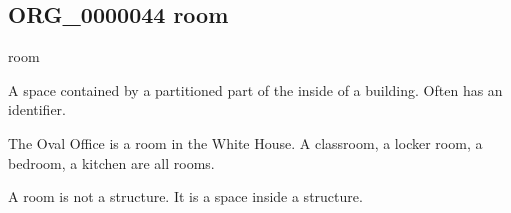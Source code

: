 \documentclass[letterpaper,10pt,english]{sphinxmanual}
\begin{document}
\begin{sphinxShadowBox}

\sphinxAtStartPar
{}
\end{sphinxShadowBox}
\begin{quote}

\ignorespaces \end{quote}


\subsection{ORG\_0000044 \sphinxhyphen{} room}
\label{\detokenize{doc-ORG_0000044:org-0000044-room}}\label{\detokenize{doc-ORG_0000044:index-0}}\label{\detokenize{doc-ORG_0000044::doc}}
\begin{sphinxShadowBox}

\sphinxAtStartPar
room
\end{sphinxShadowBox}

\begin{sphinxShadowBox}

\sphinxAtStartPar
A space contained by a partitioned part of the inside of a building.  Often has an identifier.
\end{sphinxShadowBox}

\begin{sphinxShadowBox}

\sphinxAtStartPar
{}
\end{sphinxShadowBox}

\begin{sphinxShadowBox}

\sphinxAtStartPar
The Oval Office is a room in the White House.  A classroom, a locker room, a bedroom, a kitchen are all rooms.
\end{sphinxShadowBox}

\begin{sphinxShadowBox}

\sphinxAtStartPar
A room is not a structure.  It is a space inside a structure.
\end{sphinxShadowBox}

\begin{sphinxShadowBox}

\sphinxAtStartPar
{}
\end{sphinxShadowBox}
\end{document}
